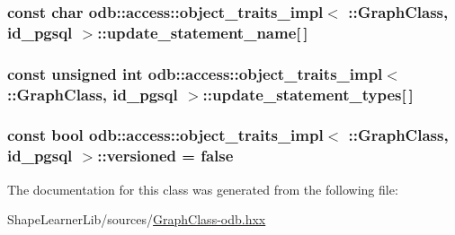 \subsubsection[{update\+\_\+statement\+\_\+name}]{\setlength{\rightskip}{0pt plus 5cm}const char odb\+::access\+::object\+\_\+traits\+\_\+impl$<$ \+::{\bf Graph\+Class}, id\+\_\+pgsql $>$\+::update\+\_\+statement\+\_\+name\mbox{[}$\,$\mbox{]}\hspace{0.3cm}{\ttfamily [static]}}\label{classodb_1_1access_1_1object__traits__impl_3_01_1_1_graph_class_00_01id__pgsql_01_4_a233bbbf595cf585975b9d9aef7fa1ccf}
\hypertarget{classodb_1_1access_1_1object__traits__impl_3_01_1_1_graph_class_00_01id__pgsql_01_4_ac51df20eb0831504e95bc3b298e9b271}{}
\subsubsection[{update\+\_\+statement\+\_\+types}]{\setlength{\rightskip}{0pt plus 5cm}const unsigned int odb\+::access\+::object\+\_\+traits\+\_\+impl$<$ \+::{\bf Graph\+Class}, id\+\_\+pgsql $>$\+::update\+\_\+statement\+\_\+types\mbox{[}$\,$\mbox{]}\hspace{0.3cm}{\ttfamily [static]}}\label{classodb_1_1access_1_1object__traits__impl_3_01_1_1_graph_class_00_01id__pgsql_01_4_ac51df20eb0831504e95bc3b298e9b271}
\hypertarget{classodb_1_1access_1_1object__traits__impl_3_01_1_1_graph_class_00_01id__pgsql_01_4_a87b3909997f588604ea9a6758a5cdf55}{}
\subsubsection[{versioned}]{\setlength{\rightskip}{0pt plus 5cm}const {\bf bool} odb\+::access\+::object\+\_\+traits\+\_\+impl$<$ \+::{\bf Graph\+Class}, id\+\_\+pgsql $>$\+::versioned = false\hspace{0.3cm}{\ttfamily [static]}}\label{classodb_1_1access_1_1object__traits__impl_3_01_1_1_graph_class_00_01id__pgsql_01_4_a87b3909997f588604ea9a6758a5cdf55}


The documentation for this class was generated from the following file\+:\begin{DoxyCompactItemize}
\item 
Shape\+Learner\+Lib/sources/\hyperlink{_graph_class-odb_8hxx}{Graph\+Class-\/odb.\+hxx}\end{DoxyCompactItemize}
